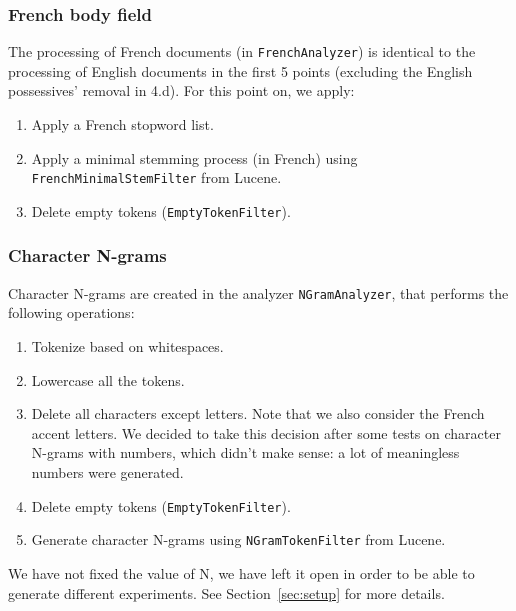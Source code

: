\subsubsection{French body field}
The processing of French documents (in \texttt{FrenchAnalyzer}) is identical to the processing of English documents in
the first 5 points (excluding the English possessives' removal in 4.d).
For this point on, we apply:
\begin{enumerate}[start=6]
    \item Apply a French stopword list. %
    \item Apply a minimal stemming process (in French) using \texttt{FrenchMinimalStemFilter} from Lucene.
    \item Delete empty tokens (\texttt{EmptyTokenFilter}).
\end{enumerate}

\subsubsection{Character N-grams}
Character N-grams are created in the analyzer \texttt{NGramAnalyzer}, that performs the following operations:
\begin{enumerate}
    \item Tokenize based on whitespaces.
    \item Lowercase all the tokens.
    \item Delete all characters except letters.
    Note that we also consider the French accent letters.
    We decided to take this decision after some tests on character N-grams with numbers, which didn't make sense: a lot of meaningless numbers were generated.
    \item Delete empty tokens (\texttt{EmptyTokenFilter}).
    \item Generate character N-grams using \texttt{NGramTokenFilter} from Lucene.
\end{enumerate}
We have not fixed the value of N, we have left it open in order to be able to generate different experiments.
See Section~\ref{sec:setup} for more details.


